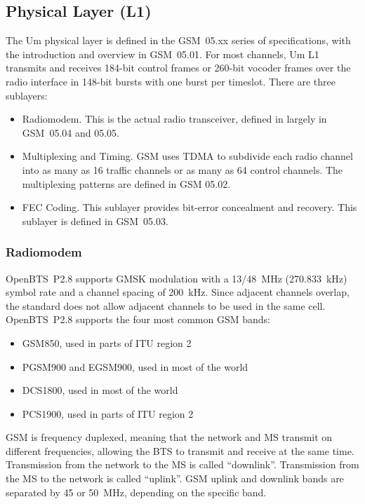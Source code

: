 \documentclass[11pt,openany]{book}
\begin{document}
\subsection{Physical Layer (L1)}
The Um physical layer is defined in the GSM~05.xx series of specifications, with the introduction and overview in GSM~05.01. For most channels, Um L1 transmits and receives 184-bit control frames or 260-bit vocoder frames over the radio interface in 148-bit bursts with one burst per timeslot. There are three sublayers:
\begin{itemize}
	\item Radiomodem. This is the actual radio transceiver, defined in largely in GSM~05.04 and 05.05.
	\item Multiplexing and Timing. GSM uses TDMA to subdivide each radio channel into as many as 16 traffic channels or as many as 64 control channels. The multiplexing patterns are defined in GSM 05.02.
	\item FEC Coding. This sublayer provides bit-error concealment and recovery.  This sublayer is defined in GSM~05.03.
\end{itemize}

\subsubsection{Radiomodem}
\label{sec:radiomodem}
OpenBTS~P2.8 supports GMSK modulation with a 13/48~MHz (270.833~kHz) symbol rate and a channel spacing of 200~kHz. Since adjacent channels overlap, the standard does not allow adjacent channels to be used in the same cell. 
OpenBTS~P2.8 supports the four most common GSM bands:
\begin{itemize}
	\item GSM850, used in parts of ITU region 2
	\item PGSM900 and EGSM900, used in most of the world
	\item DCS1800, used in most of the world
	\item PCS1900, used in parts of ITU region 2
\end{itemize}

GSM is frequency duplexed, meaning that the network and MS transmit on different frequencies, allowing the BTS to transmit and receive at the same time.
Transmission from the network to the MS is called ``downlink''.
Transmission from the MS to the network is called ``uplink''.
GSM uplink and downlink bands are separated by 45 or 50~MHz, depending on the specific band.
\end{document}
